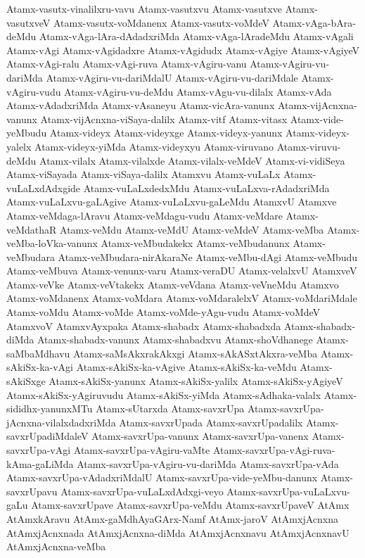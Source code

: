 {Atamx-vasutx-vinalilxru-vavu
Atamx-vasutxvu
Atamx-vasutxve
Atamx-vasutxveV
Atamx-vasutx-voMdanenx
Atamx-vasutx-voMdeV
Atamx-vAga-bAra-deMdu
Atamx-vAga-lAra-dAdadxriMda
Atamx-vAga-lAradeMdu
Atamx-vAgali
Atamx-vAgi
Atamx-vAgidadxre
Atamx-vAgidudx
Atamx-vAgiye
Atamx-vAgiyeV
Atamx-vAgi-ralu
Atamx-vAgi-ruva
Atamx-vAgiru-vanu
Atamx-vAgiru-vu-dariMda
Atamx-vAgiru-vu-dariMdalU
Atamx-vAgiru-vu-dariMdale
Atamx-vAgiru-vudu
Atamx-vAgiru-vu-deMdu
Atamx-vAgu-vu-dilalx
Atamx-vAda
Atamx-vAdadxriMda
Atamx-vAsaneyu
Atamx-vicAra-vanunx
Atamx-vijAcnxna-vanunx
Atamx-vijAcnxna-viSaya-dalilx
Atamx-vitf
Atamx-vitasx
Atamx-vide-yeMbudu
Atamx-videyx
Atamx-videyxge
Atamx-videyx-yanunx
Atamx-videyx-yalelx
Atamx-videyx-yiMda
Atamx-videyxyu
Atamx-viruvano
Atamx-viruvu-deMdu
Atamx-vilalx
Atamx-vilalxde
Atamx-vilalx-veMdeV
Atamx-vi-vidiSeya
Atamx-viSayada
Atamx-viSaya-dalilx
Atamxvu
Atamx-vuLaLx
Atamx-vuLaLxdAdxgide
Atamx-vuLaLxdedxMdu
Atamx-vuLaLxva-rAdadxriMda
Atamx-vuLaLxvu-gaLAgive
Atamx-vuLaLxvu-gaLeMdu
AtamxvU
Atamxve
Atamx-veMdaga-lAravu
Atamx-veMdagu-vudu
Atamx-veMdare
Atamx-veMdathaR
Atamx-veMdu
Atamx-veMdU
Atamx-veMdeV
Atamx-veMba
Atamx-veMba-loVka-vanunx
Atamx-veMbudakekx
Atamx-veMbudanunx
Atamx-veMbudara
Atamx-veMbudara-nirAkaraNe
Atamx-veMbu-dAgi
Atamx-veMbudu
Atamx-veMbuva
Atamx-venunx-varu
Atamx-veraDU
Atamx-velalxvU
AtamxveV
Atamx-veVke
Atamx-veVtakekx
Atamx-veVdana
Atamx-veVneMdu
Atamxvo
Atamx-voMdanenx
Atamx-voMdara
Atamx-voMdaralelxV
Atamx-voMdariMdale
Atamx-voMdu
Atamx-voMde
Atamx-voMde-yAgu-vudu
Atamx-voMdeV
AtamxvoV
AtamxvAyxpaka
Atamx-shabadx
Atamx-shabadxda
Atamx-shabadx-diMda
Atamx-shabadx-vanunx
Atamx-shabadxvu
Atamx-shoVdhanege
Atamx-saMbaMdhavu
Atamx-saMsAkxrakAkxgi
Atamx-sAkASxtAkxra-veMba
Atamx-sAkiSx-ka-vAgi
Atamx-sAkiSx-ka-vAgive
Atamx-sAkiSx-ka-veMdu
Atamx-sAkiSxge
Atamx-sAkiSx-yanunx
Atamx-sAkiSx-yalilx
Atamx-sAkiSx-yAgiyeV
Atamx-sAkiSx-yAgiruvudu
Atamx-sAkiSx-yiMda
Atamx-sAdhaka-valalx
Atamx-sididhx-yanunxMTu
Atamx-sUtarxda
Atamx-savxrUpa
Atamx-savxrUpa-jAcnxna-vilalxdadxriMda
Atamx-savxrUpada
Atamx-savxrUpadalilx
Atamx-savxrUpadiMdaleV
Atamx-savxrUpa-vanunx
Atamx-savxrUpa-vanenx
Atamx-savxrUpa-vAgi
Atamx-savxrUpa-vAgiru-vaMte
Atamx-savxrUpa-vAgi-ruva-kAma-gaLiMda
Atamx-savxrUpa-vAgiru-vu-dariMda
Atamx-savxrUpa-vAda
Atamx-savxrUpa-vAdadxriMdalU
Atamx-savxrUpa-vide-yeMbu-danunx
Atamx-savxrUpavu
Atamx-savxrUpa-vuLaLxdAdxgi-veyo
Atamx-savxrUpa-vuLaLxvu-gaLu
Atamx-savxrUpave
Atamx-savxrUpa-veMdu
Atamx-savxrUpaveV
AtAmx
AtAmxkAravu
AtAmx-gaMdhAyaGArx-Namf
AtAmx-jaroV
AtAmxjAcnxna
AtAmxjAcnxnada
AtAmxjAcnxna-diMda
AtAmxjAcnxnavu
AtAmxjAcnxnavU
AtAmxjAcnxna-veMba
}
